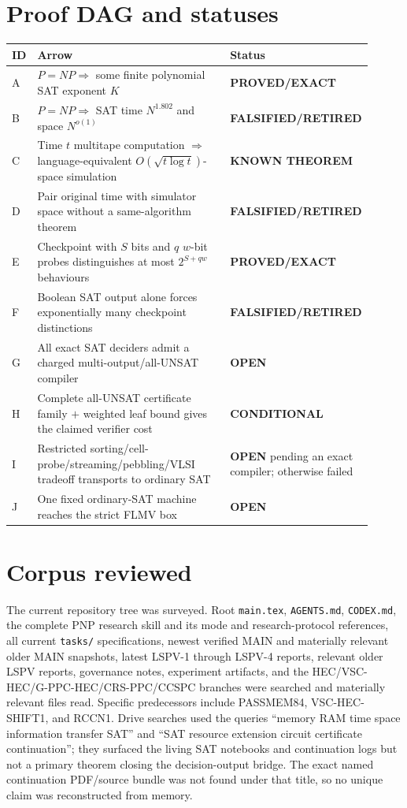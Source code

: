 \documentclass[11pt]{article}
\newcommand{\proved}{\textbf{PROVED/EXACT}}
\newcommand{\known}{\textbf{KNOWN THEOREM}}
\newcommand{\cond}{\textbf{CONDITIONAL}}
\newcommand{\openstatus}{\textbf{OPEN}}
\newcommand{\retired}{\textbf{FALSIFIED/RETIRED}}
\begin{document}
\section*{Proof DAG and statuses}
\begin{longtable}{p{0.06\linewidth}p{0.68\linewidth}p{0.17\linewidth}}
\toprule
ID & Arrow & Status\\
\midrule
A & $P=NP\Rightarrow$ some finite polynomial SAT exponent $K$ & \proved\\
B & $P=NP\Rightarrow$ SAT time $N^{1.802}$ and space $N^{o(1)}$ & \retired\\
C & Time $t$ multitape computation $\Rightarrow$ language-equivalent
$O(\sqrt{t\log t})$-space simulation & \known\\
D & Pair original time with simulator space without a same-algorithm theorem & \retired\\
E & Checkpoint with $S$ bits and $q$ $w$-bit probes distinguishes at most
$2^{S+qw}$ behaviours & \proved\\
F & Boolean SAT output alone forces exponentially many checkpoint distinctions & \retired\\
G & All exact SAT deciders admit a charged multi-output/all-UNSAT compiler & \openstatus\\
H & Complete all-UNSAT certificate family $+$ weighted leaf bound gives the
claimed verifier cost & \cond\\
I & Restricted sorting/cell-probe/streaming/pebbling/VLSI tradeoff transports to
ordinary SAT & \openstatus{} pending an exact compiler; otherwise failed\\
J & One fixed ordinary-SAT machine reaches the strict FLMV box & \openstatus\\
\bottomrule
\end{longtable}

\section*{Corpus reviewed}
The current repository tree was surveyed.  Root \texttt{main.tex},
\texttt{AGENTS.md}, \texttt{CODEX.md}, the complete PNP research skill and its mode
and research-protocol references, all current \texttt{tasks/} specifications, newest
verified MAIN and materially relevant older MAIN snapshots, latest LSPV-1 through
LSPV-4 reports, relevant older LSPV reports, governance notes, experiment artifacts,
and the HEC/VSC-HEC/G-PPC-HEC/CRS-PPC/CCSPC branches were searched and materially
relevant files read.  Specific predecessors include PASSMEM84, VSC-HEC-SHIFT1, and
RCCN1.  Drive searches used the queries ``memory RAM time space information transfer
SAT'' and ``SAT resource extension circuit certificate continuation''; they surfaced
the living SAT notebooks and continuation logs but not a primary theorem closing the
decision-output bridge.  The exact named continuation PDF/source bundle was not found
under that title, so no unique claim was reconstructed from memory.
\end{document}
